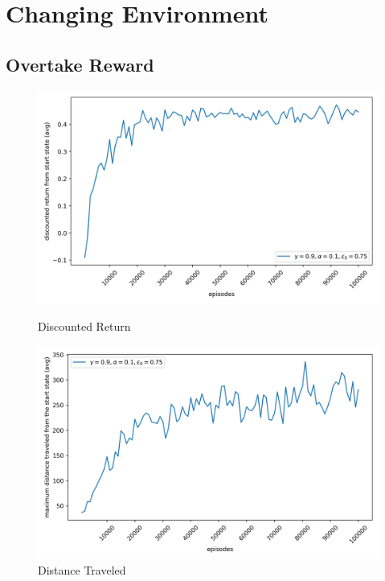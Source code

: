 \section{Changing Environment}
\subsection{Overtake Reward}

\begin{figure}[H]
    \centering
    \begin{minipage}{0.49\linewidth}
        \centering
        \includegraphics[width=\linewidth]{plots/part1-e.1-rewards.png}
        \caption{Discounted Return}
        
    \end{minipage}
    \hfill
    \begin{minipage}{0.49\linewidth}
        \centering
        \includegraphics[width=\linewidth]{plots/part1-e.1-distances.png}
        \caption{Distance Traveled}
    \end{minipage}


\end{figure}
